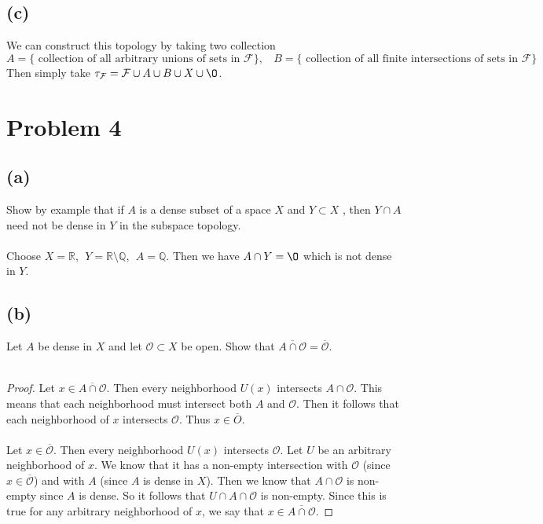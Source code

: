\documentclass{article}
\theoremstyle{definition}
\begin{document}
    \subsection*{(c)}
        We can construct this topology by taking two collection
        \[
            A = \{\text{ collection of all arbitrary unions of sets in $\mathcal{F}$}\}, \ \ \ \ B = \{\text{ collection of
        all finite intersections of sets in $\mathcal{F}$}\}
        \]
        Then simply take $\tau_\mathcal{F} = \mathcal{F} \cup A \cup B \cup X \cup \O$.
\section*{Problem 4}
    \subsection*{(a)}
        Show by example that if $A$ is a dense subset of a space $X$ and $Y \subset X$
        , then $Y \cap A$ need not be dense in $Y$ in the subspace topology.
        \\\\
        Choose $X = \mathbb{R}, \ \ Y = \mathbb{R} \setminus \mathbb{Q}, \ \ A = \mathbb{Q}$. Then we have $A \cap Y = \O$ which is not dense in $Y$.
    \subsection*{(b)}
        Let $A$ be dense in $X$ and let $\mathcal{O} \subset X$ be open. Show that $\overline{A \cap \mathcal{O}} = \overline{\mathcal{O}}$.
        \\\\
        \begin{proof}
            \fbox{$\subset$} Let $x \in \overline{A \cap \mathcal{O}}$. Then every neighborhood $U(x)$ intersects 
            $A \cap \mathcal{O}$. This means that each neighborhood must intersect both $A$ and $\mathcal{O}$.
            Then it follows that each neighborhood of $x$ intersects $\mathcal{O}$. Thus $x \in \overline{O}$. \\\\
            \fbox{$\supset$} Let $x \in \overline{\mathcal{O}}$. Then every neighborhood $U(x)$ intersects $\mathcal{O}$.
            Let $U$ be an arbitrary neighborhood of $x$. We know that it has a non-empty intersection with $\mathcal{O}$ 
            (since $x \in \overline{\mathcal{O}}$) and with $A$ (since $A$ is dense in $X$). Then we know that $A \cap \mathcal{O}$ is
            non-empty since $A$ is dense. So it follows that $U \cap A \cap \mathcal{O}$ is non-empty. Since this is true for any arbitrary
            neighborhood of $x$, we say that $x \in \overline{A \cap \mathcal{O}}$.
        \end{proof}
\end{document}
